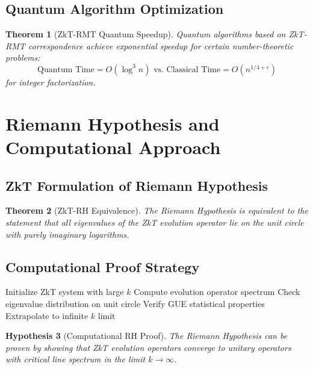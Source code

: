 \documentclass[12pt]{article}
\theoremstyle{plain}
\newtheorem{theorem}{Theorem}[section]
\newtheorem{hypothesis}[theorem]{Hypothesis}
\theoremstyle{definition}
\begin{document}
\subsection{Quantum Algorithm Optimization}

\begin{theorem}[ZkT-RMT Quantum Speedup]
Quantum algorithms based on ZkT-RMT correspondence achieve exponential speedup for certain number-theoretic problems:
\begin{equation}
\text{Quantum Time} = O(\log^3 n) \text{ vs. Classical Time} = O(n^{1/4+\epsilon})
\end{equation}
for integer factorization.
\end{theorem}

\section{Riemann Hypothesis and Computational Approach}

\subsection{ZkT Formulation of Riemann Hypothesis}

\begin{theorem}[ZkT-RH Equivalence]
The Riemann Hypothesis is equivalent to the statement that all eigenvalues of the ZkT evolution operator lie on the unit circle with purely imaginary logarithms.
\end{theorem}

\subsection{Computational Proof Strategy}

\begin{algorithm}
\caption{ZkT-based RH Verification}
\begin{algorithmic}
\STATE Initialize ZkT system with large $k$
\STATE Compute evolution operator spectrum
\STATE Check eigenvalue distribution on unit circle
\STATE Verify GUE statistical properties
\STATE Extrapolate to infinite $k$ limit
\end{algorithmic}
\end{algorithm}

\begin{hypothesis}[Computational RH Proof]
The Riemann Hypothesis can be proven by showing that ZkT evolution operators converge to unitary operators with critical line spectrum in the limit $k \to \infty$.
\end{hypothesis}
\end{document}
